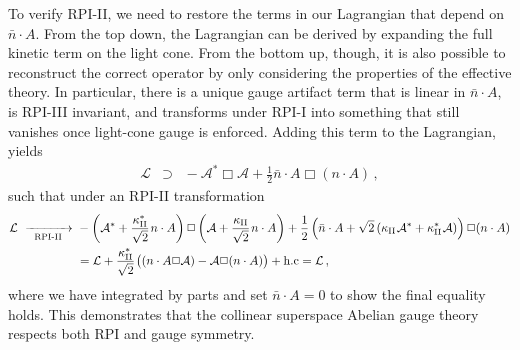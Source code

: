 \documentclass[12pt,document,nofootinbib,superscriptaddress,onecolumn,preprintnumbers,balancelastpage]{article}
\newcommand{\s}{\hspace{0.8pt}}
\newcommand{\RPIii}{\,\,\xrightarrow[\hspace{5pt}\text{RPI-II}\hspace{5pt}]{}\,\,}
\newcommand{\alc}{\mathcal{A}}
\begin{document}
\begin{spacing}{1.2}
To verify RPI-II, we need to restore the terms in our Lagrangian that depend on $\bar{n}\cdot A$.
%
From the top down, the Lagrangian can be derived by expanding the full kinetic term on the light cone.
%
From the bottom up, though, it is also possible to reconstruct the correct operator by only considering the properties of the effective theory.
%
In particular, there is a unique gauge artifact term that is linear in $\bar{n}\cdot A$, is RPI-III invariant, and transforms under RPI-I into something that still vanishes once light-cone gauge is enforced.
%
Adding this term to the Lagrangian, yields
%
\begin{align}
\mathcal{L} \,\,\,  \supset  \,\,\, - \alc^* \Box \alc + \frac{1}{2} \bar{n} \cdot A \Box (n \cdot A) \,,
\end{align} 
such that under an RPI-II transformation
\begin{align}
\mathcal{L} \RPIii & - \left( \alc^* + \frac{\kappa_{\rm II}^*}{\sqrt{2}} \s n \cdot A \right) \Box \left( \alc + \frac{\kappa_{\rm II}}{\sqrt{2}}\s n \cdot A \right) + \frac{1}{2}\left( \bar{n} \cdot A +\sqrt{2} \left( \kappa_{\rm II}\s \alc^* + \kappa_{\rm II}^*\s \alc \right)\right) \Box (n\cdot A) \nonumber\\ 
& = \mathcal{L} + \frac{\kappa_{\rm II}^*}{\sqrt{2}}\s \big( (n\cdot A \Box \alc)  - \alc \Box (n\cdot A)  \big) + \text{h.c} = \mathcal{L}\,,
\end{align}
where we have integrated by parts and set $\bar{n} \cdot A = 0$ to show the final equality holds.
%
This demonstrates that the collinear superspace Abelian gauge theory respects both RPI and gauge symmetry.



\end{spacing}
\end{document}
